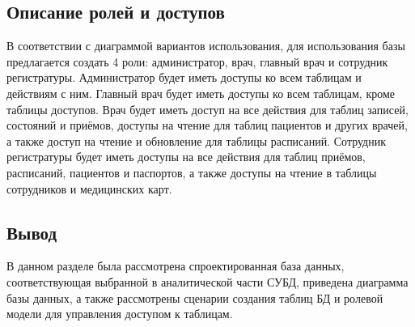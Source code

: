 \subsection{Описание ролей и доступов}

В соответствии с диаграммой вариантов использования, для использования базы предлагается создать 4 роли: администратор, врач, главный врач и сотрудник регистратуры. 
Администратор будет иметь доступы ко всем таблицам и действиям с ним. 
Главный врач будет иметь доступы ко всем таблицам, кроме таблицы доступов.
Врач будет иметь доступ на все действия для таблиц записей, состояний и приёмов, доступы на чтение для таблиц пациентов и других врачей, а также доступ на чтение и обновление для таблицы расписаний.
Сотрудник регистратуры будет иметь доступы на все действия для таблиц приёмов, расписаний, пациентов и паспортов, а также доступы на чтение в таблицы сотрудников и медицинских карт.

\subsection*{Вывод}

В данном разделе  была рассмотрена спроектированная база данных, соответствующая выбранной в  аналитической части СУБД, приведена диаграмма базы данных, а также рассмотрены сценарии создания таблиц БД и ролевой модели для управления доступом к таблицам.

